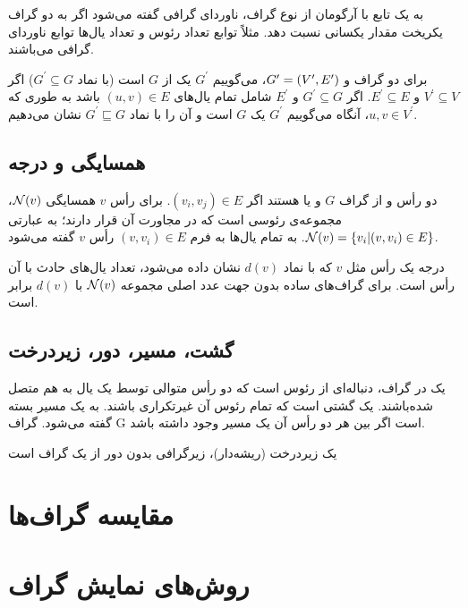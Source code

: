 به یک تابع با آرگومان از نوع گراف، ناوردای گرافی
 گفته می‌شود اگر به دو گراف یکریخت مقدار یکسانی نسبت دهد. مثلاً توابع تعداد رئوس و تعداد یال‌ها توابع ناوردای گرافی می‌باشند.

برای دو گراف  و $G^{\prime} = (V^{\prime},E^{\prime})$، می‌گوییم $G^{\prime}$ یک  از $G$ است (با نماد $G^\prime \subseteq G$) اگر $V^\prime \subseteq V$ و $E^\prime \subseteq E$. اگر $G^\prime \subseteq G$ و $E^\prime$ شامل تمام یال‌های $(u,v) \in E$ باشد به طوری که $u,v \in V^\prime$، آنگاه می‌گوییم $G^\prime$ یک  $G$ است و آن را با نماد $G^\prime \sqsubseteq G$ نشان می‌دهیم.

\subsection{همسایگی و درجه}
دو رأس \Vi و \Vj از گراف $G$  و یا  هستند اگر $(v_i,v_j) \in E$. برای رأس $v$ همسایگی $\mathcal{N}(v)$، مجموعه‌ی رئوسی است که در مجاورت آن قرار دارند؛ به عبارتی
$\mathcal{N}(v) = \{v_i | (v,v_i) \in E\}$.
به تمام یال‌ها به فرم $(v,v_i) \in E$  رأس $v$ گفته می‌شود.

درجه یک رأس مثل $v$ که با نماد $d(v)$ نشان داده می‌شود، تعداد یال‌های حادث با آن رأس است. برای گراف‌های ساده بدون جهت عدد اصلی مجموعه $\mathcal{N}(v)$ با $d(v)$ برابر است.

\subsection{گشت، مسیر، دور، زیردرخت}
یک  در گراف، دنباله‌ای از رئوس است که دو رأس متوالی توسط یک یال به هم متصل شده‌باشند. یک  گشتی است که تمام رئوس آن غیرتکراری باشند. به یک مسیر بسته  گفته می‌شود. گراف G  است اگر بین هر دو رأس آن یک مسیر وجود داشته باشد.

 
یک زیردرخت (ریشه‌دار)، زیرگرافی بدون دور از یک گراف است
\section{مقایسه گراف‌ها}
\section{روش‌های نمایش گراف}
